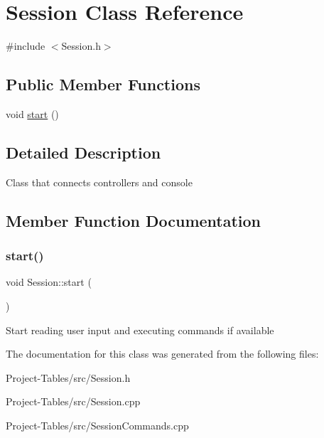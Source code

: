 \hypertarget{classSession}{}\section{Session Class Reference}
\label{classSession}


{\ttfamily \#include $<$Session.\+h$>$}

\subsection*{Public Member Functions}
\begin{DoxyCompactItemize}
\item 
void \hyperlink{classSession_a47baf956cead0046fcbac45c572c70d3}{start} ()
\end{DoxyCompactItemize}


\subsection{Detailed Description}
Class that connects controllers and console 

\subsection{Member Function Documentation}
\mbox{\label{classSession_a47baf956cead0046fcbac45c572c70d3}} 
\subsubsection{\texorpdfstring{start()}{start()}}
{\footnotesize\ttfamily void Session\+::start (\begin{DoxyParamCaption}{ }\end{DoxyParamCaption})}

Start reading user input and executing commands if available 

The documentation for this class was generated from the following files\+:\begin{DoxyCompactItemize}
\item 
Project-\/\+Tables/src/Session.\+h\item 
Project-\/\+Tables/src/Session.\+cpp\item 
Project-\/\+Tables/src/Session\+Commands.\+cpp\end{DoxyCompactItemize}
